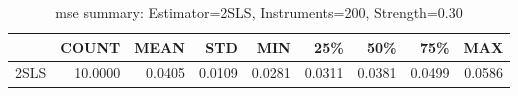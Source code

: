 \begin{table}[ht]
\centering
\caption{mse summary: Estimator=2SLS, Instruments=200, Strength=0.30}
\begin{tabular}{lrrrrrrrr}
\toprule
 & COUNT & MEAN & STD & MIN & 25\% & 50\% & 75\% & MAX \\
\midrule
2SLS & 10.0000 & 0.0405 & 0.0109 & 0.0281 & 0.0311 & 0.0381 & 0.0499 & 0.0586 \\
\bottomrule
\end{tabular}
\end{table}
